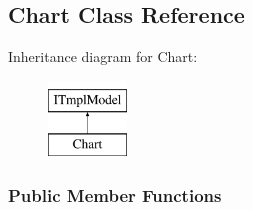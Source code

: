 \hypertarget{classHighcharts_1_1Chart}{}\subsection{Chart Class Reference}
\label{classHighcharts_1_1Chart}
Inheritance diagram for Chart\+:\begin{figure}[H]
\begin{center}
\leavevmode
\includegraphics[height=2.000000cm]{classHighcharts_1_1Chart}
\end{center}
\end{figure}
\subsubsection*{Public Member Functions}
